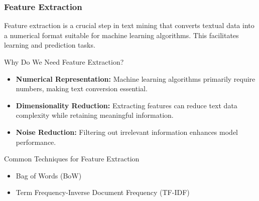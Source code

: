 \documentclass[aspectratio=169]{beamer}
\begin{document}
\begin{frame}[fragile]
    \frametitle{Feature Extraction}
    Feature extraction is a crucial step in text mining that converts textual data into a numerical format suitable for machine learning algorithms. This facilitates learning and prediction tasks.
    
    \begin{block}{Why Do We Need Feature Extraction?}
        \begin{itemize}
            \item \textbf{Numerical Representation:} Machine learning algorithms primarily require numbers, making text conversion essential.
            \item \textbf{Dimensionality Reduction:} Extracting features can reduce text data complexity while retaining meaningful information.
            \item \textbf{Noise Reduction:} Filtering out irrelevant information enhances model performance.
        \end{itemize}
    \end{block}
    
    \pause
    
    \begin{block}{Common Techniques for Feature Extraction}
        \begin{itemize}
            \item Bag of Words (BoW)
            \item Term Frequency-Inverse Document Frequency (TF-IDF)
        \end{itemize}
    \end{block}
\end{frame}
\end{document}
